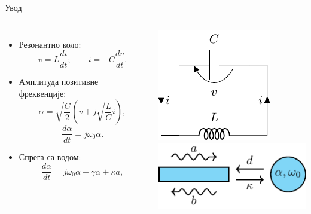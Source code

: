\documentclass{beamer}
\begin{document}
\begin{frame}[t]{Увод}

    \begin{columns}[c]
        \begin{itemize}
            \item Резонантно коло:
                \begin{equation*}
                    v = L \frac{d i}{d t}; \qquad i = -C \frac{d v}{d t}.
                \end{equation*}
            \item Амплитуда позитивне фреквенције: 
                \begin{equation*}
                    \alpha = \sqrt{\frac{C}{2}}\left( v + j\sqrt{\frac{L}{C}}i  \right),
                    \label{tsm:pamp}
                \end{equation*}
                \begin{equation*}
                    \frac{d\alpha}{dt} = j\omega_0 \alpha.
                    \label{tsm:smdif1}
                \end{equation*}
            \item Спрега са водом:
                \begin{equation*}
                    \frac{d\alpha}{dt} = j\omega_0 \alpha - \gamma \alpha + \kappa a,
                    \label{tsm:smdif2}
                \end{equation*}
        \end{itemize}
        \centering    
        \includegraphics[width=0.6\linewidth]{sl_tsm/lckolo.pdf}\\[1cm]
        \includegraphics[width=0.8\linewidth]{sl_tsm/sm-vod1.pdf}
    \end{columns}
    
\end{frame}
\end{document}
